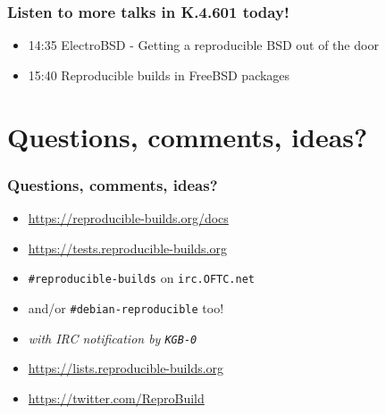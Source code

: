 \documentclass[14pt]{beamer}
\begin{document}
\begin{frame}
 \frametitle{Listen to more talks in K.4.601 today!}

 \begin{itemize}
  \item 14:35 ElectroBSD - Getting a reproducible BSD out of the door
  \item 15:40 Reproducible builds in FreeBSD packages
 \end{itemize}
\end{frame}


\section{Questions, comments, ideas?}


\begin{frame}
 \frametitle{Questions, comments, ideas?}

 \begin{itemize}
  \item<2-3> \url{https://reproducible-builds.org/docs}
  \item<2-3> \url{https://tests.reproducible-builds.org}
  \item<2-3> \texttt{\#reproducible-builds} on \texttt{irc.OFTC.net}
  \item<2-3> \small{and/or \texttt{\#debian-reproducible} too!}
  \item<2-3> \small\it{with IRC notification by \texttt{KGB-0}}
  \item<3> \url{https://lists.reproducible-builds.org}
  \item<3> \url{https://twitter.com/ReproBuild}
  \end{itemize}
\end{frame}
\end{document}
